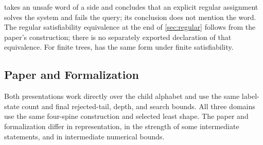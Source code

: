  takes an unsafe word of a side and
concludes that an explicit regular assignment solves the system and fails
the query; its conclusion does not mention the word. The regular
satisfiability equivalence
at the end of \cref{sec:regular} follows from the paper's construction;
there is no separately exported declaration of that equivalence.
For finite trees,  has the same form
under finite satisfiability.

\subsection{Paper and Formalization}
\label{app:lean-diff}
Both presentations work directly over the child alphabet and use the same
label-state count and final rejected-tail, depth, and search bounds. All three
domains use the same four-spine construction and selected least shape.
The paper and formalization differ in representation, in the strength
of some intermediate statements, and in intermediate numerical bounds.
